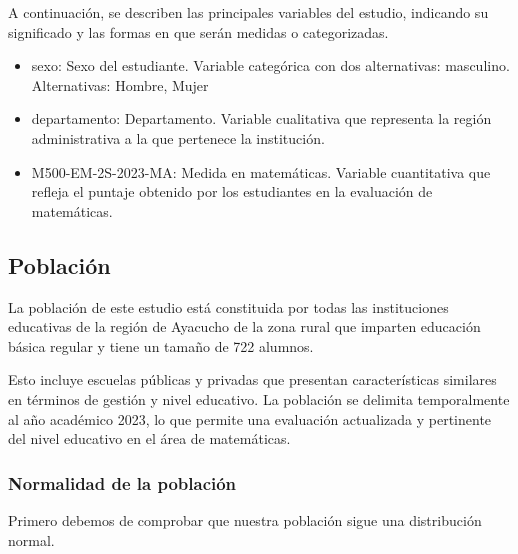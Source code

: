 \documentclass[
]{article}
\newenvironment{Shaded}{\begin{snugshade}}{\end{snugshade}}
\newcommand{\FunctionTok}[1]{\textcolor[rgb]{0.13,0.29,0.53}{\textbf{#1}}}
\newcommand{\NormalTok}[1]{#1}
\newcommand{\OtherTok}[1]{\textcolor[rgb]{0.56,0.35,0.01}{#1}}
\newcommand{\SpecialCharTok}[1]{\textcolor[rgb]{0.81,0.36,0.00}{\textbf{#1}}}
\newcommand{\StringTok}[1]{\textcolor[rgb]{0.31,0.60,0.02}{#1}}
\begin{document}
A continuación, se describen las principales variables del estudio,
indicando su significado y las formas en que serán medidas o
categorizadas.

\begin{itemize}
    \item sexo: Sexo del estudiante. Variable categórica con dos alternativas: masculino. Alternativas: Hombre, Mujer
    \item departamento: Departamento. Variable cualitativa que representa la región administrativa a la que pertenece la institución.
    \item M500-EM-2S-2023-MA: Medida en matemáticas. Variable cuantitativa que refleja el puntaje obtenido por los estudiantes en la evaluación de matemáticas.

\end{itemize}

\subsection*{Población}\label{poblaciuxf3n}

La población de este estudio está constituida por todas las
instituciones educativas de la región de Ayacucho de la zona rural que
imparten educación básica regular y tiene un tamaño de 722 alumnos.

Esto incluye escuelas públicas y privadas que presentan características
similares en términos de gestión y nivel educativo. La población se
delimita temporalmente al año académico 2023, lo que permite una
evaluación actualizada y pertinente del nivel educativo en el área de
matemáticas.

\subsubsection*{Normalidad de la
población}\label{normalidad-de-la-poblaciuxf3n}

Primero debemos de comprobar que nuestra población sigue una
distribución normal.

\begin{Shaded}
\end{Shaded}
\end{document}
